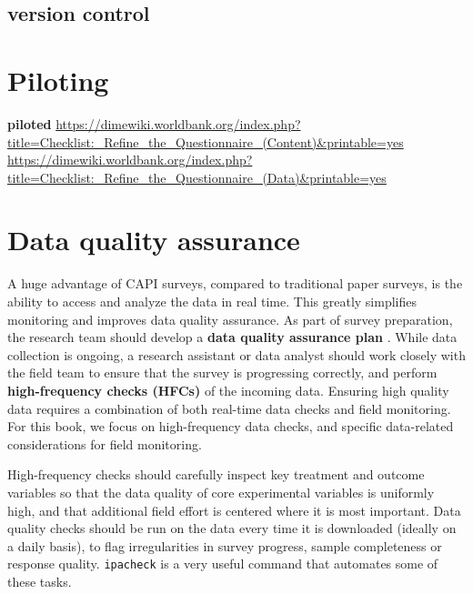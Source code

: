 \subsection{version control}


\section{Piloting}
\textbf{piloted}
\url{https://dimewiki.worldbank.org/index.php?title=Checklist:_Refine_the_Questionnaire_(Content)&printable=yes}
\url{https://dimewiki.worldbank.org/index.php?title=Checklist:_Refine_the_Questionnaire_(Data)&printable=yes}


\section{Data quality assurance}

A huge advantage of CAPI surveys, compared to traditional paper surveys, is the ability to access and analyze the data in real time. 
This greatly simplifies monitoring and improves data quality assurance. As part of survey preparation, the research team should develop a 
\textbf{data quality assurance plan} . While data collection is ongoing, a research assistant or data analyst should work closely with the field team to ensure that the survey is progressing correctly, and perform \textbf{high-frequency checks (HFCs)} of the incoming data. 
Ensuring high quality data requires a combination of both real-time data checks and field monitoring. For this book, we focus on high-frequency data checks, and specific data-related considerations for field monitoring.

High-frequency checks should carefully inspect key treatment and outcome variables so that the data quality of core experimental variables is uniformly high,
and that additional field effort is centered where it is most important. Data quality checks should be run on the data every time it is downloaded (ideally on a daily basis), to flag irregularities in survey progress, sample completeness or response quality.
\texttt{ipacheck} 
is a very useful command that automates some of these tasks.

